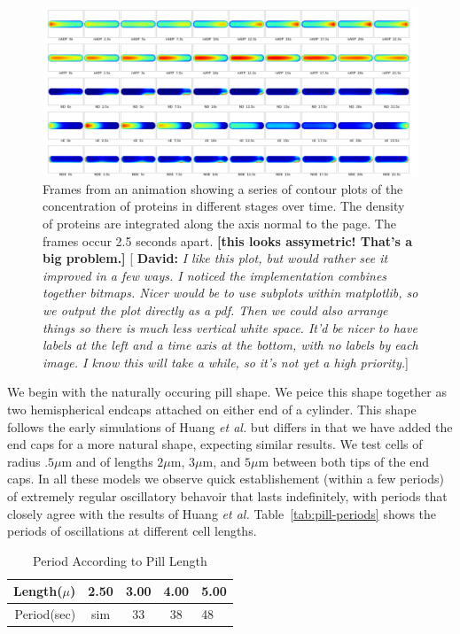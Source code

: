 \documentclass[letterpaper,twocolumn,amsmath,amssymb,pre]{revtex4-1}
\newcommand{\red}[1]{{\bf \color{red} #1}}
\newcommand{\green}[1]{{\bf \color{green} #1}}
\newcommand{\fixme}[1]{\red{[#1]}}
\newcommand{\davidsays}[1]{{\color{red} [\green{David:} \emph{#1}]}}
\newcommand\micron{\ensuremath{\mu\text{m}}}
\begin{document}
\begin{figure}
  \includegraphics[width=\textwidth]{../data/shape-p/plots/image-plot--p-400-50-0-0-1500.pdf}
  \caption{Frames from an animation showing a series of contour plots
    of the concentration of proteins in different stages over time.
    The density of proteins are integrated along the axis normal to
    the page. The frames occur 2.5 seconds apart. \fixme{this looks
      assymetric! That's a big problem.} \davidsays{I like this plot,
      but would rather see it improved in a few ways.  I noticed the
      implementation combines together bitmaps.  Nicer would be to use
      subplots within matplotlib, so we output the plot directly as a
      pdf.  Then we could also arrange things so there is much less
      vertical white space.  It'd be nicer to have labels at the left
      and a time axis at the bottom, with no labels by each image.  I
      know this will take a while, so it's not yet a high priority.}}
  \label{image-p}
\end{figure}

We begin with the naturally occuring pill shape.  We peice this shape
together as two hemispherical endcaps attached on either end of a
cylinder.  This shape follows the early simulations of Huang \emph{et
  al.} but differs in that we have added the end caps for a more
natural shape, expecting similar results.  We test cells of radius
$.5\micron$ and of lengths $2\micron$, $3\micron$, and $5\micron$
between both tips of the end caps. In all these models we observe
quick establishement (within a few periods) of extremely regular
oscillatory behavoir that lasts indefinitely, with periods that
closely agree with the results of Huang \emph{et al.}
Table~\ref{tab:pill-periods} shows the periods of oscillations
at different cell lengths.

\begin{table}
  \begin{tabular}{|r|c|c|c|l|}
    \hline
    Length($\mu$) & 2.50 & 3.00 & 4.00 & 5.00\\
    \hline
    Period(sec) & sim & 33 & 38 & 48 \\ \cline{2-2}
    \hline
  \end{tabular}
  \caption{Period According to Pill Length}\label{tab:pill-period}
\end{table}
\end{document}
